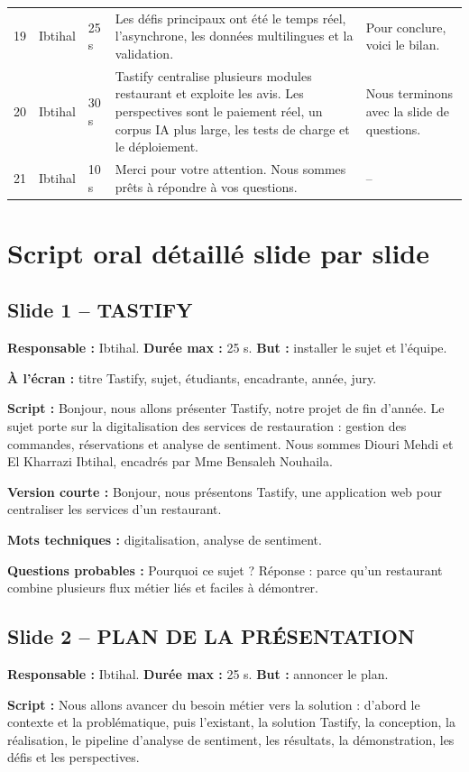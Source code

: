 \documentclass[11pt,a4paper]{article}
\begin{document}
\begin{longtable}{p{0.8cm}p{2cm}p{2cm}p{5.4cm}p{4.6cm}}
19 & Ibtihal & 25 s & Les défis principaux ont été le temps réel, l'asynchrone, les données multilingues et la validation. & Pour conclure, voici le bilan.\\
20 & Ibtihal & 30 s & Tastify centralise plusieurs modules restaurant et exploite les avis. Les perspectives sont le paiement réel, un corpus IA plus large, les tests de charge et le déploiement. & Nous terminons avec la slide de questions.\\
21 & Ibtihal & 10 s & Merci pour votre attention. Nous sommes prêts à répondre à vos questions. & --\\
\bottomrule
\end{longtable}

\section{Script oral détaillé slide par slide}

\subsection*{Slide 1 -- TASTIFY}
\textbf{Responsable :} Ibtihal. \textbf{Durée max :} 25 s. \textbf{But :} installer le sujet et l'équipe.

\textbf{À l'écran :} titre Tastify, sujet, étudiants, encadrante, année, jury.

\textbf{Script :} Bonjour, nous allons présenter Tastify, notre projet de fin d'année. Le sujet porte sur la digitalisation des services de restauration : gestion des commandes, réservations et analyse de sentiment. Nous sommes Diouri Mehdi et El Kharrazi Ibtihal, encadrés par Mme Bensaleh Nouhaila.

\textbf{Version courte :} Bonjour, nous présentons Tastify, une application web pour centraliser les services d'un restaurant.

\textbf{Mots techniques :} digitalisation, analyse de sentiment.

\textbf{Questions probables :} Pourquoi ce sujet ? Réponse : parce qu'un restaurant combine plusieurs flux métier liés et faciles à démontrer.

\subsection*{Slide 2 -- PLAN DE LA PRÉSENTATION}
\textbf{Responsable :} Ibtihal. \textbf{Durée max :} 25 s. \textbf{But :} annoncer le plan.

\textbf{Script :} Nous allons avancer du besoin métier vers la solution : d'abord le contexte et la problématique, puis l'existant, la solution Tastify, la conception, la réalisation, le pipeline d'analyse de sentiment, les résultats, la démonstration, les défis et les perspectives.
\end{document}

